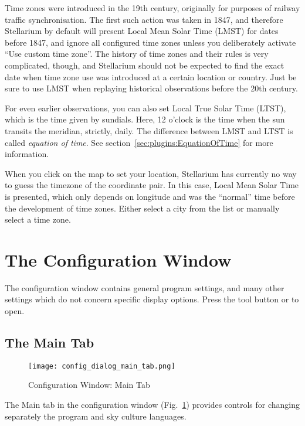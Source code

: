 Time zones were introduced in the 19th century, originally for
purposes of railway traffic synchronisation. The first such action was
taken in 1847, and therefore Stellarium by default will present Local
Mean Solar Time (LMST) for dates before 1847, and ignore all
configured time zones unless you deliberately activate ``Use custom
time zone''. The history of time zones and their rules is very
complicated, though, and Stellarium should not be expected to find the
exact date when time zone use was introduced at a certain location or
country. Just be sure to use LMST when replaying historical
observations before the 20th century.

For even earlier observations, you can also set Local True Solar Time
(LTST), which is the time given by sundials. Here, 12 o'clock is the
time when the sun transits the meridian, strictly, daily. The
difference between LMST and LTST is called \emph{equation of
  time}. See section~\ref{sec:plugins:EquationOfTime} for more
information.

When you click on the map to set your location, Stellarium has
currently no way to guess the timezone of the coordinate pair. In this
case, Local Mean Solar Time is presented, which only depends on
longitude and was the ``normal'' time before the development of time
zones. Either select a city from the list or manually select a time
zone.

\section{The Configuration Window}
\label{sec:gui:configuration}

The configuration window contains general program settings, and many
other settings which do not concern specific display options. Press
the tool button  or  to open.


\subsection{The Main Tab}
\label{sec:gui:configuration:main}


\begin{figure}[htbp]
\centering\texttt{[image: config\_dialog\_main\_tab.png]}
\caption{Configuration Window: Main Tab}
\label{fig:gui:configuration:main}
\end{figure}

The Main tab in the configuration window (Fig.~\ref{fig:gui:configuration:main}) provides controls for
changing separately the program and sky culture languages.

